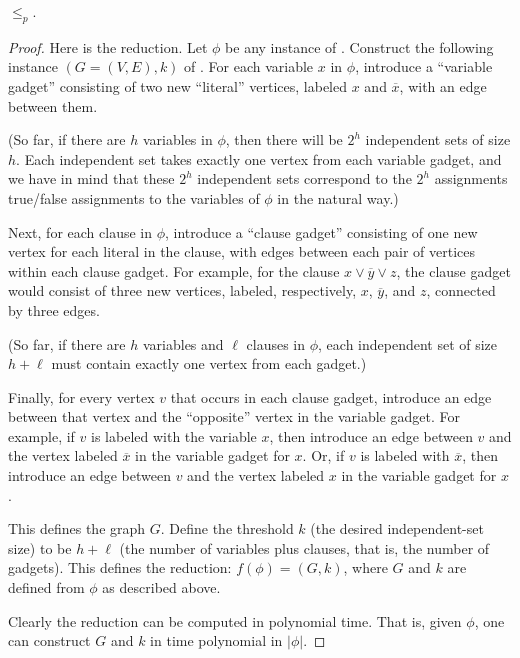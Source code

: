 \documentclass[11pt]{article}
\begin{document}
\begin{lemma}
  ${} \le_p {}$.
\end{lemma}
\begin{proof}
  Here is the reduction.  Let $\phi$ be any instance of .
  Construct the following instance $(G=(V,E), k)$ of .
  For each variable $x$ in $\phi$,
  introduce a ``variable gadget'' consisting of two new ``literal'' vertices, labeled $x$ and $\overline x$,
  with an edge between them.

  (So far, if there are $h$ variables in $\phi$,
  then there will be $2^h$ independent sets of size $h$.
  Each independent set takes exactly one vertex from each variable gadget,
  and we have in mind that these $2^h$ independent sets
  correspond to the $2^h$ assignments true/false assignments to the variables of $\phi$
  in the natural way.)

  Next, for each clause in $\phi$,
  introduce a ``clause gadget'' consisting of one new vertex for each literal in the clause,
  with edges between each pair of vertices within each clause gadget.
  For example, for the clause $x\vee \overline y \vee z$,
  the clause gadget would consist of three new vertices,
  labeled, respectively, $x$, $\overline y$, and $z$,
  connected by three edges.

  (So far, if there are $h$ variables and $\ell$ clauses in $\phi$,
  each independent set of size $h+\ell$ must contain exactly one vertex from each gadget.)

  Finally, for every vertex $v$ that occurs in each clause gadget,
  introduce an edge between that vertex and the ``opposite'' vertex in the variable gadget.
  For example, if $v$ is labeled with the variable $x$,
  then introduce an edge between $v$ and the vertex labeled $\overline x$ in the variable gadget for $x$.
  Or, if $v$ is labeled with $\overline x$,
  then introduce an edge between $v$ and the vertex labeled $x$ in the variable gadget for $x$.

  This defines the graph $G$.
  Define the threshold $k$ (the desired independent-set size) to be $h+\ell$
  (the number of variables plus clauses, that is, the number of gadgets).
  This defines the reduction:
  $f(\phi) = (G,k)$, where $G$ and $k$ are defined from $\phi$ as described above.  

  Clearly the reduction can be computed in polynomial time.
  That is, given $\phi$, one can construct $G$ and $k$ in time polynomial in $|\phi|$.


\end{proof}
\end{document}

